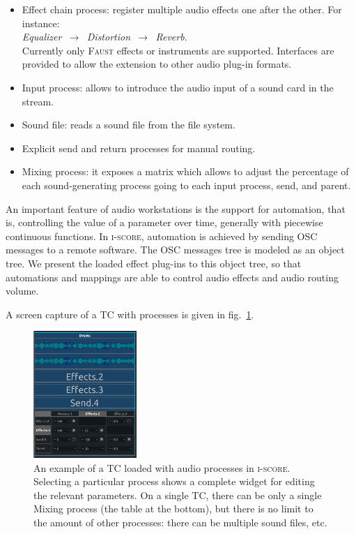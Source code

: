 \documentclass{article}
\newcommand*{\iscore}{\textsc{i-score}\xspace}
\newcommand*{\faust}{\textsc{Faust}\xspace}
\newcommand*{\timeconstraint}{\ac{TC}\xspace}
\begin{document}
\begin{itemize}
	\item Effect chain process: register multiple audio effects one after the other. 
	For instance:~\\ \emph{Equalizer $\,\to\,$ Distortion $\,\to\,$ Reverb}. ~\\
	Currently only \faust effects or instruments are supported. 
    Interfaces are provided to allow the extension to other audio plug-in formats.
	\item Input process: allows to introduce the audio input of a sound card in the stream.
	\item Sound file: reads a sound file from the file system.
	\item Explicit send and return processes for manual routing.
	\item Mixing process: it exposes a matrix which allows to adjust the percentage of each sound-generating process going to each input process, send, and parent.
\end{itemize}

An important feature of audio workstations is the support for automation, that is, 
controlling the value of a parameter over time, generally with piecewise continuous functions.
In \iscore, automation is achieved by sending OSC messages to a remote software.
The OSC messages tree is modeled as an object tree.
We present the loaded effect plug-ins to this object tree, so that automations 
and mappings are able to control audio effects and audio routing volume.

A screen capture of a \timeconstraint with processes is given in fig.~\ref{fig.iscoreconstraint}.
\begin{figure}
	\centering
	\includegraphics[width=0.35\textwidth]{figures/mix.png}
	\caption{An example of a \timeconstraint loaded with audio processes in \iscore. 
		Selecting a particular process shows a complete widget for editing the relevant parameters. On a single \timeconstraint, there can be only a single Mixing process (the table at the bottom), but there is no limit to the amount of other processes: there can be multiple sound files, etc.}
	\label{fig.iscoreconstraint}
\end{figure}
\end{document}
